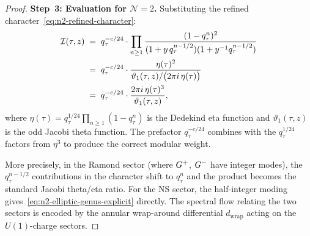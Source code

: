 \begin{proof}
\medskip\noindent
\textbf{Step~3: Evaluation for $\mathcal N=2$.}
Substituting the refined
character~\eqref{eq:n2-refined-character}:
\begin{align}
\mathcal{I}(\tau,z)
&\;=\;
q_\tau^{-c/24}\cdot
\prod_{n\ge 1}
\frac{(1-q_\tau^n)^2}
{(1+y\,q_\tau^{n-1/2})(1+y^{-1}q_\tau^{n-1/2})}
\notag\\
&\;=\;
q_\tau^{-c/24}\cdot
\frac{\eta(\tau)^2}
{\vartheta_1(\tau,z)/
\bigl(2\pi i\,\eta(\tau)\bigr)}
\notag\\
&\;=\;
q_\tau^{-c/24}\cdot
\frac{2\pi i\,\eta(\tau)^3}
{\vartheta_1(\tau,z)},
\label{eq:n2-elliptic-genus-explicit}
\end{align}
where $\eta(\tau) = q_\tau^{1/24}\prod_{n\ge 1}(1-q_\tau^n)$
is the Dedekind eta function and
$\vartheta_1(\tau,z)$ is the odd Jacobi theta function.
The prefactor $q_\tau^{-c/24}$ combines with the
$q_\tau^{1/24}$ factors from $\eta^3$ to produce the
correct modular weight.

More precisely, in the Ramond sector (where
$G^+$, $G^-$ have integer modes), the
$q_\tau^{n-1/2}$ contributions in the character shift to
$q_\tau^n$ and the product
becomes the standard Jacobi theta/eta ratio.
For the NS sector, the half-integer moding
gives~\eqref{eq:n2-elliptic-genus-explicit} directly.
The spectral flow relating the two sectors is encoded
by the annular wrap-around differential $d_{\mathrm{wrap}}$
acting on the $U(1)$-charge sectors.
\end{proof}

